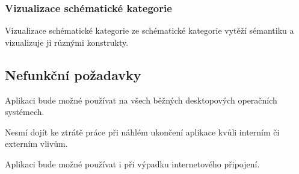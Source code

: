 \subsubsection*{Vizualizace schématické kategorie}

\begin{enumfp}[resume]
  \item Vizualizace schématické kategorie ze schématické kategorie vytěží sémantiku a vizualizuje ji různými konstrukty.
\end{enumfp}

\subsection{Nefunkční požadavky}

\begin{enumnfp}
  \item Aplikaci bude možné používat na všech běžných desktopových operačních systémech.
  \item Nesmí dojít ke ztrátě práce při náhlém ukončení aplikace kvůli interním či externím vlivům.
  \item Aplikaci bude možné používat i při výpadku internetového připojení.
\end{enumnfp}
